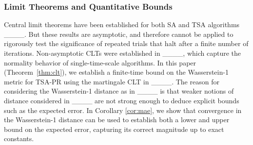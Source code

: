 \subsubsection{Limit Theorems and Quantitative Bounds}
Central limit theorems have been established for both SA and TSA algorithms ____.
But these results are asymptotic, and therefore cannot be applied to rigorously test the significance of repeated trials that halt after a finite number of iterations. 
Non-asymptotic CLTs were established in ____, which capture the normality behavior of single-time-scale algorithms.
In this paper (Theorem~\ref{thm:clt}), we establish a finite-time bound on the Wasserstein-1 metric for TSA-PR using the martingale CLT in ____. 
The reason for considering the Wasserstein-1 distance as in ____ is that weaker notions of distance considered in ____ are not strong enough to deduce explicit bounds such as the expected error.   
In Corollary \ref{cor:mae}, we show that convergence in the Wasserstein-1 distance can be used to establish both a lower and upper bound on the expected error, capturing its correct magnitude up to exact constants.